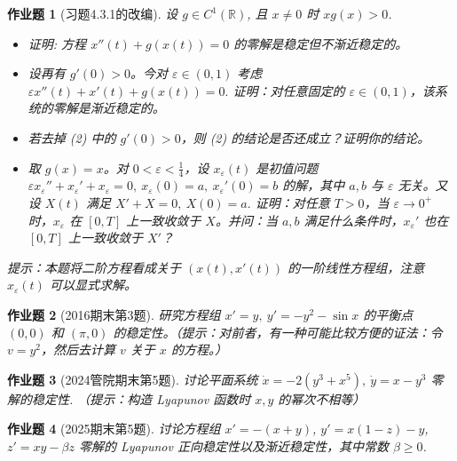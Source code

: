 \documentclass[UTF8,fontset=windows,12pt]{ctexart}
\theoremstyle{kaiti-theorem}
\newtheorem{problem}{作业题}
\numberwithin{equation}{section}
\newcommand{\R}{\mathbb{R}}
\newcommand{\eps}{\varepsilon}
\begin{document}
\begin{problem}[习题4.3.1的改编]
设 $g\in C^1(\R)$, 且 $x\neq 0$ 时 $xg(x)>0$. 
\begin{itemize}
\item [(1)] 证明: 方程 $x''(t)+g(x(t))=0$ 的零解是稳定但不渐近稳定的。
\item [(2)] 设再有 $g'(0)>0$。今对 $\eps\in(0,1)$ 考虑\(\varepsilon x''(t)+x'(t)+g(x(t))=0.\) 证明：对任意固定的 $\eps\in(0,1)$，该系统的零解是渐近稳定的。
\item [(3)] 若去掉 (2) 中的 $g'(0)>0$，则 (2) 的结论是否还成立？证明你的结论。
\item [(4)] 取 \(g(x)=x\)。对 \(0<\varepsilon<\frac14\)，设 \(x_\varepsilon(t)\) 是初值问题 \(\varepsilon x_\varepsilon''+x_\varepsilon'+x_\varepsilon=0,~x_\varepsilon(0)=a,~ x_\varepsilon'(0)=b\)
的解，其中 \(a,b\) 与 \(\varepsilon\) 无关。又设 \(X(t)\) 满足 $X'+X=0,~ X(0)=a.$ 证明：对任意 \(T>0\)，当 \(\varepsilon\to0^+\) 时，\(x_\varepsilon\) 在 \([0,T]\) 上一致收敛于 \(X\)。并问：当 $a,b$ 满足什么条件时，\(x_\varepsilon'\) 也在 \([0,T]\) 上一致收敛于 \(X'\)？
\end{itemize}

提示：本题将二阶方程看成关于 $(x(t),x'(t))$ 的一阶线性方程组，注意 $x_\eps(t)$ 可以显式求解。
\end{problem}

\begin{problem}[2016期末第3题]
研究方程组 $x'=y,\ y'=-y^2-\sin x$ 的平衡点 $(0,0)$ 和 $(\pi,0)$ 的稳定性。（提示：对前者，有一种可能比较方便的证法：令 $v=y^2$，然后去计算 $v$ 关于 $x$ 的方程。）
\end{problem}

\begin{problem}[2024管院期末第5题]
讨论平面系统 $\dot{x}=-2(y^{3}+x^{5}),~\dot{y}=x-y^3$ 零解的稳定性. （提示：构造 Lyapunov 函数时 $x,y$ 的幂次不相等）
\end{problem}

\begin{problem}[2025期末第5题]
讨论方程组 $x'=-(x+y)$, $y'=x(1-z)-y$, $z'=xy-\beta z$ 零解的 Lyapunov 正向稳定性以及渐近稳定性，其中常数 $\beta\geqslant 0$.
\end{problem}
\end{document}
